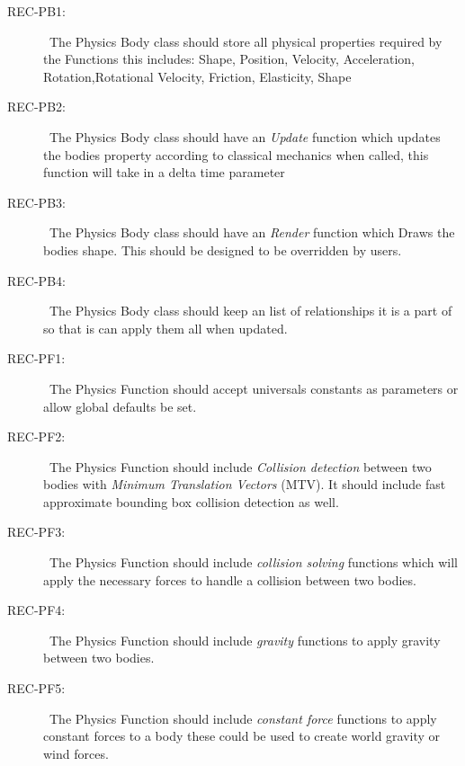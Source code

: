 \documentclass{scrreprt}
\begin{document}
\begin{description}
\item [{REC-PB1:}]~The Physics Body class should store all physical properties required by the Functions this includes: Shape, Position, Velocity, Acceleration, Rotation,Rotational Velocity, Friction, Elasticity, Shape
\item [{REC-PB2:}]~The Physics Body class should have an \textit{Update} function which updates the bodies property according to classical mechanics when called,  this function will take in a delta time parameter 
\item [{REC-PB3:}]~The Physics Body class should have an \textit{Render} function which Draws the bodies shape.  This should be designed to be overridden by users.
\item [{REC-PB4:}]~The Physics Body class should keep an list of relationships it is a part of so that is can apply them all when updated.

\item [{REC-PF1:}]~The Physics Function should accept universals constants as parameters or allow global defaults be set.
\item [{REC-PF2:}]~The Physics Function should include \textit{Collision detection} between two bodies with \textit{Minimum Translation Vectors} (MTV).  It should include fast approximate bounding box collision detection as well.
\item [{REC-PF3:}]~The Physics Function should include \textit{collision solving} functions which will apply the necessary forces to handle a collision between two bodies.
\item [{REC-PF4:}]~The Physics Function should include \textit{gravity} functions to apply gravity between two bodies.
\item [{REC-PF5:}]~The Physics Function should include \textit{constant force} functions to apply constant forces to a body these could be used to create world gravity or wind forces.


\end{description}
\end{document}
